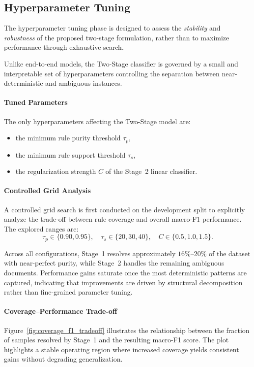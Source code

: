 \subsection{Hyperparameter Tuning}

The hyperparameter tuning phase is designed to assess the \emph{stability} and
\emph{robustness} of the proposed two-stage formulation, rather than to maximize
performance through exhaustive search.

Unlike end-to-end models, the Two-Stage classifier is governed by a small and
interpretable set of hyperparameters controlling the separation between
near-deterministic and ambiguous instances.

\paragraph{Tuned Parameters}
The only hyperparameters affecting the Two-Stage model are:
\begin{itemize}
	\item the minimum rule purity threshold $\tau_p$,
	\item the minimum rule support threshold $\tau_s$,
	\item the regularization strength $C$ of the Stage~2 linear classifier.
\end{itemize}

\paragraph{Controlled Grid Analysis}
A controlled grid search is first conducted on the development split to explicitly
analyze the trade-off between rule coverage and overall macro-F1 performance.
The explored ranges are:
\[
\tau_p \in \{0.90, 0.95\}, \quad
\tau_s \in \{20, 30, 40\}, \quad
C \in \{0.5, 1.0, 1.5\}.
\]

Across all configurations, Stage~1 resolves approximately $16\%$--$20\%$ of the
dataset with near-perfect purity, while Stage~2 handles the remaining ambiguous
documents. Performance gains saturate once the most deterministic patterns are
captured, indicating that improvements are driven by structural decomposition
rather than fine-grained parameter tuning.

\paragraph{Coverage--Performance Trade-off}
Figure~\ref{fig:coverage_f1_tradeoff} illustrates the relationship between the
fraction of samples resolved by Stage~1 and the resulting macro-F1 score.
The plot highlights a stable operating region where increased coverage yields
consistent gains without degrading generalization.

